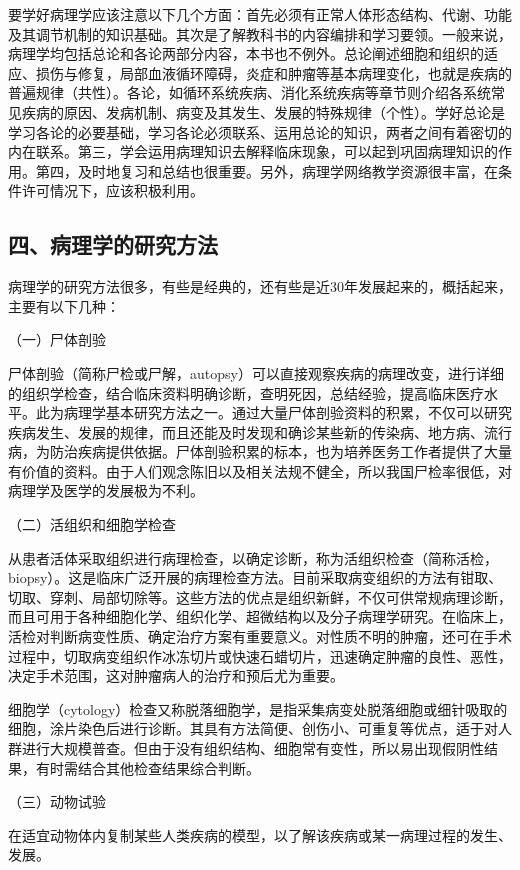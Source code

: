 要学好病理学应该注意以下几个方面：首先必须有正常人体形态结构、代谢、功能及其调节机制的知识基础。其次是了解教科书的内容编排和学习要领。一般来说，病理学均包括总论和各论两部分内容，本书也不例外。总论阐述细胞和组织的适应、损伤与修复，局部血液循环障碍，炎症和肿瘤等基本病理变化，也就是疾病的普遍规律（共性）。各论，如循环系统疾病、消化系统疾病等章节则介绍各系统常见疾病的原因、发病机制、病变及其发生、发展的特殊规律（个性）。学好总论是学习各论的必要基础，学习各论必须联系、运用总论的知识，两者之间有着密切的内在联系。第三，学会运用病理知识去解释临床现象，可以起到巩固病理知识的作用。第四，及时地复习和总结也很重要。另外，病理学网络教学资源很丰富，在条件许可情况下，应该积极利用。

\subsection*{四、病理学的研究方法}

病理学的研究方法很多，有些是经典的，还有些是近30年发展起来的，概括起来，主要有以下几种：

{（一）尸体剖验}

尸体剖验（简称尸检或尸解，autopsy）可以直接观察疾病的病理改变，进行详细的组织学检查，结合临床资料明确诊断，查明死因，总结经验，提高临床医疗水平。此为病理学基本研究方法之一。通过大量尸体剖验资料的积累，不仅可以研究疾病发生、发展的规律，而且还能及时发现和确诊某些新的传染病、地方病、流行病，为防治疾病提供依据。尸体剖验积累的标本，也为培养医务工作者提供了大量有价值的资料。由于人们观念陈旧以及相关法规不健全，所以我国尸检率很低，对病理学及医学的发展极为不利。

{（二）活组织和细胞学检查}

从患者活体采取组织进行病理检查，以确定诊断，称为活组织检查（简称活检，biopsy）。这是临床广泛开展的病理检查方法。目前采取病变组织的方法有钳取、切取、穿刺、局部切除等。这些方法的优点是组织新鲜，不仅可供常规病理诊断，而且可用于各种细胞化学、组织化学、超微结构以及分子病理学研究。在临床上，活检对判断病变性质、确定治疗方案有重要意义。对性质不明的肿瘤，还可在手术过程中，切取病变组织作冰冻切片或快速石蜡切片，迅速确定肿瘤的良性、恶性，决定手术范围，这对肿瘤病人的治疗和预后尤为重要。

细胞学（cytology）检查又称脱落细胞学，是指采集病变处脱落细胞或细针吸取的细胞，涂片染色后进行诊断。其具有方法简便、创伤小、可重复等优点，适于对人群进行大规模普查。但由于没有组织结构、细胞常有变性，所以易出现假阴性结果，有时需结合其他检查结果综合判断。

{（三）动物试验}

在适宜动物体内复制某些人类疾病的模型，以了解该疾病或某一病理过程的发生、发展。

